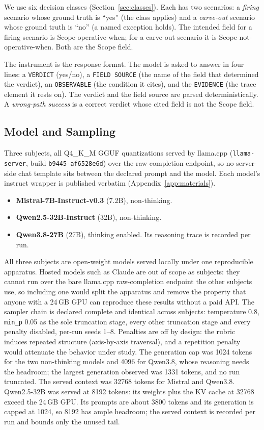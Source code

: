 \documentclass[11pt,a4paper]{article}
\begin{document}
We use six decision classes (Section~\ref{sec:classes}). Each has two scenarios: a
\emph{firing} scenario whose ground truth is ``yes'' (the class applies) and a
\emph{carve-out} scenario whose ground truth is ``no'' (a named exception holds).
The intended field for a firing scenario is Scope-operative-when; for a carve-out
scenario it is Scope-not-operative-when. Both are the Scope field.

The instrument is the response format. The model is asked to answer in four lines:
a \texttt{VERDICT} (yes/no), a \texttt{FIELD SOURCE} (the name of the field that
determined the verdict), an \texttt{OBSERVABLE} (the condition it cites), and the
\texttt{EVIDENCE} (the trace element it rests on). The verdict and the field
source are parsed deterministically. A \emph{wrong-path success} is a correct
verdict whose cited field is not the Scope field.

\subsection{Model and Sampling}\label{sec:sampling}

Three subjects, all Q4\_K\_M GGUF quantizations served by llama.cpp
(\texttt{llama-server}, build \texttt{b9445-af6528e6d}) over the raw
completion endpoint, so no server-side chat template sits between the
declared prompt and the model. Each model's instruct wrapper is published verbatim
(Appendix~\ref{app:materials}).

\begin{itemize}
  \item \textbf{Mistral-7B-Instruct-v0.3} (7.2B), non-thinking.
  \item \textbf{Qwen2.5-32B-Instruct} (32B), non-thinking.
  \item \textbf{Qwen3.8-27B} (27B), thinking enabled. Its reasoning trace is
    recorded per run.
\end{itemize}

All three subjects are open-weight models served locally under one reproducible
apparatus. Hosted models such as Claude are out of scope as subjects: they cannot
run over the bare llama.cpp raw-completion endpoint the other subjects use, so
including one would split the apparatus and remove the property that anyone with a
24\,GB GPU can reproduce these results without a paid API. The sampler
chain is declared complete and identical across
subjects: temperature 0.8, \texttt{min\_p} 0.05 as the sole truncation stage,
every other truncation stage and every penalty disabled, per-run seeds 1--8.
Penalties are off by design: the rubric induces repeated structure (axis-by-axis
traversal), and a repetition penalty would attenuate the behavior under study. The
generation cap was 1024 tokens for the two non-thinking models and 4096 for
Qwen3.8, whose reasoning needs the headroom; the largest generation observed was
1331 tokens, and no run truncated. The served context was 32768 tokens for Mistral
and Qwen3.8. Qwen2.5-32B was served at 8192 tokens: its weights plus the KV cache
at 32768 exceed the 24\,GB GPU. Its prompts are about 3800 tokens and its
generation is capped at 1024, so 8192 has ample headroom; the served context is
recorded per run and bounds only the unused tail.
\end{document}
